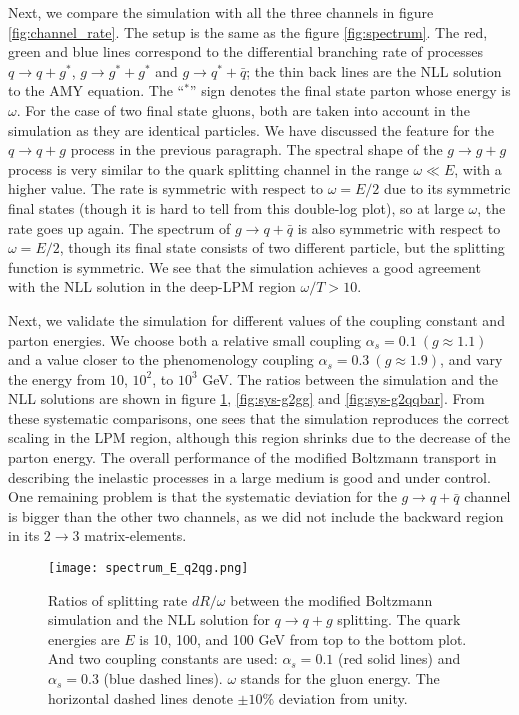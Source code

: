 Next, we compare the simulation with all the three channels in figure \ref{fig:channel_rate}.
The setup is the same as the figure \ref{fig:spectrum}.
The red, green and blue lines correspond to the differential branching rate of processes $q\rightarrow q+g^*$, $g\rightarrow g^*+g^*$ and $g\rightarrow q^*+\bar{q}$; the thin back lines are the NLL solution to the AMY equation.
The ``${}^*$'' sign denotes the final state parton whose energy is $\omega$.
For the case of two final state gluons, both are taken into account in the simulation as they are identical particles.
We have discussed the feature for the $q\rightarrow q+g$ process in the previous paragraph. 
The spectral shape of the $g\rightarrow g+g$ process is very similar to the quark splitting channel in the range $\omega \ll E$, with a higher value.
The rate is symmetric with respect to $\omega = E/2$ due to its symmetric final states (though it is hard to tell from this double-log plot), so at large $\omega$, the rate goes up again.
The spectrum of $g\rightarrow q+\bar{q}$ is also symmetric with respect to $\omega = E/2$, though its final state consists of two different particle, but the splitting function is symmetric.
We see that the simulation achieves a good agreement with the NLL solution in the deep-LPM region $\omega/T > 10$.

Next, we validate the simulation for different values of the coupling constant and parton energies.
We choose both a relative small coupling $\alpha_s = 0.1~(g \approx 1.1)$ and a value closer to the phenomenology coupling $\alpha_s = 0.3~(g \approx 1.9)$, and vary the energy from $10$, $10^2$, to $10^3$ GeV.
The ratios between the simulation and the NLL solutions are shown in figure \ref{fig:sys-q2qg}, \ref{fig:sys-g2gg} and \ref{fig:sys-g2qqbar}.
From these systematic comparisons,
one sees that the simulation reproduces the correct scaling in the LPM region, although this region shrinks due to the decrease of the parton energy.
The overall performance of the modified Boltzmann transport in describing the inelastic processes in a large medium is good and under control.
One remaining problem is that the systematic deviation for the $g\rightarrow q+\bar{q}$ channel is bigger than the other two channels, as we did not include the backward region in its $2\rightarrow 3$ matrix-elements.

\begin{figure}
\centering
\texttt{[image: spectrum\_E\_q2qg.png]}
\caption{Ratios of splitting rate $dR/\omega$ between the modified Boltzmann simulation and the NLL solution for $q\rightarrow q+g$ splitting. The quark energies are $E$ is 10, 100, and 100 GeV from top to the bottom plot. 
And two coupling constants are used: $\alpha_s = 0.1$ (red solid lines) and $\alpha_s = 0.3$ (blue dashed lines).
$\omega$ stands for the gluon energy.
The horizontal dashed lines denote $\pm 10\%$ deviation from unity. }
\label{fig:sys-q2qg}
\end{figure}

